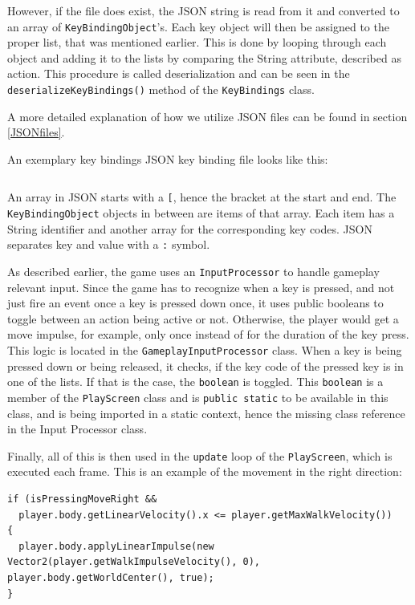 \documentclass[12p]{article}
\begin{document}
However, if the file does exist, the JSON string is read from it and converted to an array of \texttt{KeyBindingObject}'s. Each key object will then be assigned to the proper list, that was mentioned earlier. This is done by looping through each object and adding it to the lists by comparing the String attribute, described as \texttt{}{action}. This procedure is called deserialization and can be seen in the \texttt{deserializeKeyBindings()} method of the \texttt{KeyBindings} class.

A more detailed explanation of how we utilize JSON files can be found in section \ref{JSONfiles}.

An exemplary key bindings JSON key binding file looks like this:
\inputminted[linenos,breaklines]{json}{code/json/keybindings.json}

An array in JSON starts with a \texttt{[}, hence the bracket at the start and end. The \texttt{KeyBindingObject} objects in between are items of that array. Each item has a String identifier and another array for the corresponding key codes. JSON separates key and value with a \texttt{:} symbol.

As described earlier, the game uses an \texttt{InputProcessor} to handle gameplay relevant input. Since the game has to recognize when a key is pressed, and not just fire an event once a key is pressed down once, it uses public booleans to toggle between an action being active or not. Otherwise, the player would get a move impulse, for example, only once instead of for the duration of the key press. This logic is located in the \texttt{GameplayInputProcessor} class. When a key is being pressed down or being released, it checks, if the key code of the pressed key is in one of the lists. If that is the case, the \texttt{boolean} is toggled. This \texttt{boolean} is a member of the \texttt{PlayScreen} class and is \texttt{public static} to be available in this class, and is being imported in a static context, hence the missing class reference in the Input Processor class.

Finally, all of this is then used in the \texttt{update} loop of the \texttt{PlayScreen}, which is executed each frame. This is an example of the movement in the right direction:

\begin{verbatim}
if (isPressingMoveRight &&
  player.body.getLinearVelocity().x <= player.getMaxWalkVelocity()) 
{
  player.body.applyLinearImpulse(new Vector2(player.getWalkImpulseVelocity(), 0), player.body.getWorldCenter(), true);
}
\end{verbatim}
\end{document}
